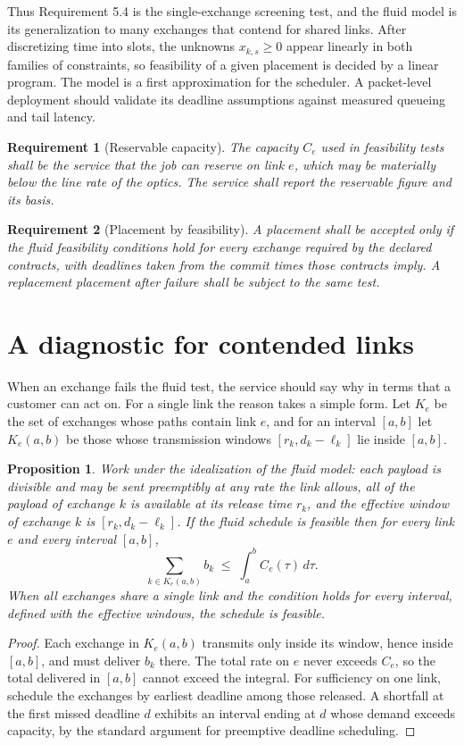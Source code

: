 \documentclass[11pt,openany]{book}
\newtheorem{proposition}{Proposition}[chapter]
\newtheorem{requirement}{Requirement}[chapter]
\theoremstyle{remark}
\begin{document}
Thus Requirement 5.4 is the single-exchange screening test, and the fluid model is its generalization to many exchanges that contend for shared links. After discretizing time into slots, the unknowns $x_{k,s}\ge0$ appear linearly in both families of constraints, so feasibility of a given placement is decided by a linear program. The model is a first approximation for the scheduler. A packet-level deployment should validate its deadline assumptions against measured queueing and tail latency.

\begin{requirement}[Reservable capacity]\label{req:reservable}
The capacity $C_e$ used in feasibility tests shall be the service that the job can reserve on link $e$, which may be materially below the line rate of the optics. The service shall report the reservable figure and its basis.
\end{requirement}

\begin{requirement}[Placement by feasibility]
A placement shall be accepted only if the fluid feasibility conditions hold for every exchange required by the declared contracts, with deadlines taken from the commit times those contracts imply. A replacement placement after failure shall be subject to the same test.
\end{requirement}

\section{A diagnostic for contended links}

When an exchange fails the fluid test, the service should say why in terms that a customer can act on. For a single link the reason takes a simple form. Let $K_e$ be the set of exchanges whose paths contain link $e$, and for an interval $[a,b]$ let $K_e(a,b)$ be those whose transmission windows $[r_k,d_k-\ell_k]$ lie inside $[a,b]$.

\begin{proposition}\label{prop:interval}
Work under the idealization of the fluid model: each payload is divisible and may be sent preemptibly at any rate the link allows, all of the payload of exchange $k$ is available at its release time $r_k$, and the effective window of exchange $k$ is $[r_k,d_k-\ell_k]$. If the fluid schedule is feasible then for every link $e$ and every interval $[a,b]$,
\[
\sum_{k\in K_e(a,b)} b_k \;\le\; \int_a^b C_e(\tau)\,d\tau .
\]
When all exchanges share a single link and the condition holds for every interval, defined with the effective windows, the schedule is feasible.
\end{proposition}
\begin{proof}
Each exchange in $K_e(a,b)$ transmits only inside its window, hence inside $[a,b]$, and must deliver $b_k$ there. The total rate on $e$ never exceeds $C_e$, so the total delivered in $[a,b]$ cannot exceed the integral. For sufficiency on one link, schedule the exchanges by earliest deadline among those released. A shortfall at the first missed deadline $d$ exhibits an interval ending at $d$ whose demand exceeds capacity, by the standard argument for preemptive deadline scheduling.
\end{proof}
\end{document}
